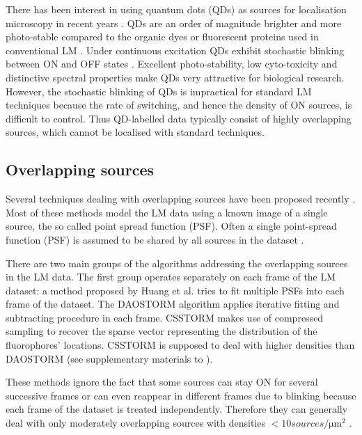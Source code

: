 There has been interest in using quantum dots (QDs) as sources for localisation microscopy in recent years \cite{Lidke2005,Lidke2007,Harrington2008,Simonson2011}. QDs are an order of magnitude brighter and more photo-stable compared to the organic dyes or fluorescent proteins used in conventional LM \cite{Resch-Genger2008}. Under continuous excitation QDs exhibit stochastic blinking between ON and OFF states \cite{Kuno2001,Stefani2009}. Excellent photo-stability, low cyto-toxicity and distinctive spectral properties make QDs very attractive for biological research. However, the stochastic blinking of QDs is impractical for standard LM techniques because the rate of switching, and hence the density of ON sources, is difficult to control. Thus QD-labelled data typically consist of highly overlapping sources, which cannot be localised with standard techniques.


\subsection{Overlapping sources\label{sec:Overlapping sources}}

Several techniques dealing with overlapping sources have been proposed recently \cite{Lidke2005,Harrington2008,Huang2011,Holden2011,Cox2011,Zhu2012}. Most of these methods model the LM data using a known image of a single source, the so called point spread function (PSF). Often a single point-spread function (PSF) is assumed to be shared by all sources in the dataset \cite{Harrington2008,Huang2011,Holden2011,Cox2011,Zhu2012}.

There are two main groups of the algorithms addressing the overlapping sources in the LM data. The first group operates separately on each frame of the LM dataset: a method proposed by Huang et al. \cite{Huang2011} tries to fit multiple PSFs into each frame of the dataset. The DAOSTORM algorithm \cite{Holden2011} applies iterative fitting and subtracting procedure in each frame.  CSSTORM \cite{Zhu2012} makes use of compressed sampling to recover the sparse vector representing the distribution of the fluorophores' locations. CSSTORM is supposed to deal with higher densities than DAOSTORM (see supplementary materials to \cite{Zhu2012}).

These methods ignore the fact that some sources can stay ON for several successive frames or can even reappear in different frames due to blinking because each frame of the dataset is treated independently. Therefore they can generally deal with only moderately overlapping sources with densities $<10\unit{sources/\um^2}$ \cite{Huang2011,Holden2011,Zhu2012}.

